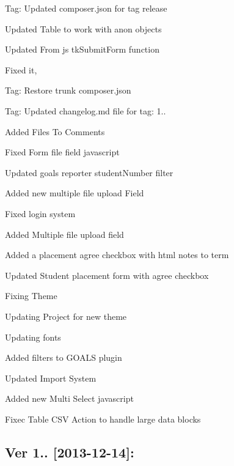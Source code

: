 \begin{DoxyItemize}
\item Tag\+: Updated composer.\+json for tag release
\item Updated Table to work with anon objects
\item Updated From js tk\+Submit\+Form function
\item Fixed it,
\item Tag\+: Restore trunk composer.\+json
\item Tag\+: Updated changelog.\+md file for tag\+: 1..
\item Added Files To Comments
\item Fixed Form file field javascript
\item Updated goals reporter student\+Number filter
\item Added new multiple file upload Field
\item Fixed login system
\item Added Multiple file upload field
\item Added a placement agree checkbox with html notes to term
\item Updated Student placement form with agree checkbox
\item Fixing Theme
\item Updating Project for new theme
\item Updating fonts
\item Added filters to G\+O\+A\+L\+S plugin
\item Updated Import System
\item Added new Multi Select javascript
\item Fixec Table C\+S\+V Action to handle large data blocks
\end{DoxyItemize}

\subsection*{Ver 1.. \mbox{[}2013-\/12-\/14\mbox{]}\+: }


